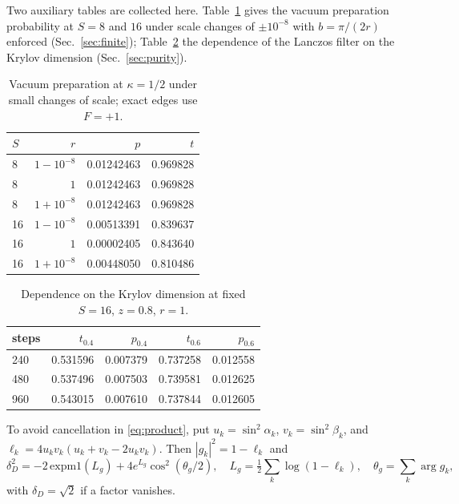 \documentclass[11pt,a4paper]{article}
\begin{document}
Two auxiliary tables are collected here. Table~\ref{tab:robust} gives the vacuum preparation probability at $S=8$ and $16$ under scale changes of $\pm10^{-8}$ with $b=\pi/(2r)$ enforced (Sec.~\ref{sec:finite}); Table~\ref{tab:lanczos} the dependence of the Lanczos filter on the Krylov dimension (Sec.~\ref{sec:purity}).
\begin{table}[h]
\centering\small
\begin{tabular}{lrrr}
\toprule
$S$ & $r$ & $p$ & $t$\\
\midrule
8 & $1-10^{-8}$ & 0.01242463 & 0.969828\\
8 & $1$ & 0.01242463 & 0.969828\\
8 & $1+10^{-8}$ & 0.01242463 & 0.969828\\
16 & $1-10^{-8}$ & 0.00513391 & 0.839637\\
16 & $1$ & 0.00002405 & 0.843640\\
16 & $1+10^{-8}$ & 0.00448050 & 0.810486\\
\bottomrule
\end{tabular}
\caption{Vacuum preparation at $\kappa=1/2$ under small changes of scale; exact edges use $F=+1$.}
\label{tab:robust}
\end{table}
\begin{table}[h]
\centering\small
\begin{tabular}{lrrrr}
\toprule
steps & $t_{0.4}$ & $p_{0.4}$ & $t_{0.6}$ & $p_{0.6}$\\
\midrule
240 & 0.531596 & 0.007379 & 0.737258 & 0.012558\\
480 & 0.537496 & 0.007503 & 0.739581 & 0.012625\\
960 & 0.543015 & 0.007610 & 0.737844 & 0.012605\\
\bottomrule
\end{tabular}
\caption{Dependence on the Krylov dimension at fixed $S=16$, $z=0.8$, $r=1$.}
\label{tab:lanczos}
\end{table}

To avoid cancellation in \eqref{eq:product}, put $u_k=\sin^2\alpha_k$, $v_k=\sin^2\beta_k$, and $\ell_k=4u_kv_k(u_k+v_k-2u_kv_k)$. Then $|g_k|^2=1-\ell_k$ and
\begin{equation}
\delta_D^2=-2\,\mathrm{expm1}(L_g)+4e^{L_g}\cos^2(\theta_g/2),\quad
L_g=\tfrac12\sum_k\log(1-\ell_k),\quad\theta_g=\sum_k\arg g_k,
\end{equation}
with $\delta_D=\sqrt2$ if a factor vanishes.
\end{document}
